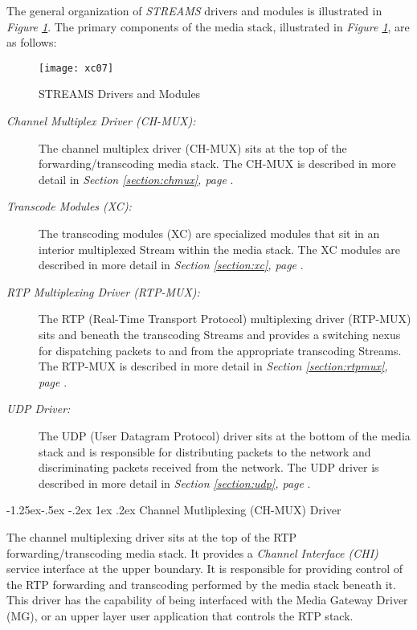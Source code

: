 \documentclass[letterpaper,final,notitlepage,twocolumn,10pt,twoside]{article}
\makeatletter
\let\normalsize = \small
\let\small = \footnotesize
\let\footnotesize = \scriptsize
\let\scriptsize = \tiny
\renewcommand\subsubsection{\@startsection{subsubsection}{3}{\z@}%
                                     {-1.25ex\@plus -.5ex \@minus -.2ex}%
                                     {1ex \@plus .2ex}%
                                     {\normalfont\normalsize\bfseries}}
\makeatother
\begin{document}
The general organization of {\sl STREAMS} drivers and modules is illustrated in
{\sl Figure \ref{figure:xc07}}.  The primary components of the media stack,
illustrated in {\sl Figure \ref{figure:xc07}}, are as follows:

\begin{figure}[htp]
\center\texttt{[image: xc07]}
\caption{STREAMS Drivers and Modules}
\label{figure:xc07}
\end{figure}

\begin{description}

\item[{\it Channel Multiplex Driver (CH-MUX):}] The channel multiplex driver
(CH-MUX) sits at the top of the forwarding/transcoding media stack.  The CH-MUX
is described in more detail in \textsl{Section \ref{section:chmux}, page
\pageref{section:chmux}}.

\item[{\it Transcode Modules (XC):}] The transcoding modules (XC) are specialized
modules that sit in an interior multiplexed Stream within the media stack.  The
XC modules are described in more detail in \textsl{Section \ref{section:xc},
page \pageref{section:xc}}.

\item[{\it RTP Multiplexing Driver (RTP-MUX):}] The RTP (Real-Time Transport
Protocol) multiplexing driver (RTP-MUX) sits and beneath the transcoding Streams
and provides a switching nexus for dispatching packets to and from the
appropriate transcoding Streams.  The RTP-MUX is described in more detail in
\textsl{Section \ref{section:rtpmux}, page \pageref{section:rtpmux}}.

\item[{\it UDP Driver:}] The UDP (User Datagram Protocol) driver sits at the
bottom of the media stack and is responsible for distributing packets to the
network and discriminating packets received from the network.  The UDP driver is
described in more detail in \textsl{Section \ref{section:udp}, page
\pageref{section:udp}}.

\end{description}

\subsubsection{Channel Mutliplexing (CH-MUX) Driver}
\label{section:chmux}

The channel multiplexing driver sits at the top of the RTP
forwarding/transcoding media stack.  It provides a \textsl{Channel Interface
(CHI)} \cite[]{CHI} service interface at the upper boundary.  It is responsible
for providing control of the RTP forwarding and transcoding performed by the
media stack beneath it.  This driver has the capability of being interfaced with
the Media Gateway Driver (MG), or an upper layer user application that controls
the RTP stack.
\end{document}
